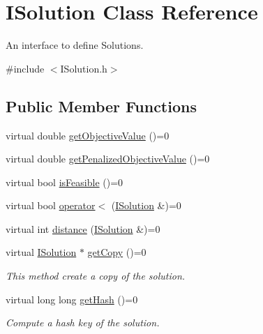 \hypertarget{classISolution}{\section{\-I\-Solution \-Class \-Reference}
\label{classISolution}
}


\-An interface to define \-Solutions.  




{\ttfamily \#include $<$\-I\-Solution.\-h$>$}

\subsection*{\-Public \-Member \-Functions}
\begin{DoxyCompactItemize}
\item 
virtual double \hyperlink{classISolution_a364e6cf3ee78b16b4b78d1a5612c5e70}{get\-Objective\-Value} ()=0
\item 
virtual double \hyperlink{classISolution_a577a02712a4e973a5acda9926d025afb}{get\-Penalized\-Objective\-Value} ()=0
\item 
virtual bool \hyperlink{classISolution_a4619382420ff245fcf12465557587ee6}{is\-Feasible} ()=0
\item 
virtual bool \hyperlink{classISolution_a9293d9e9eb00bab08dc25d11c61a1410}{operator$<$} (\hyperlink{classISolution}{\-I\-Solution} \&)=0
\item 
virtual int \hyperlink{classISolution_a60ba3056f6733fa50260466f3eb89a21}{distance} (\hyperlink{classISolution}{\-I\-Solution} \&)=0
\item 
\hypertarget{classISolution_accb0408d64b7e06f48054708eca34101}{virtual \hyperlink{classISolution}{\-I\-Solution} $\ast$ \hyperlink{classISolution_accb0408d64b7e06f48054708eca34101}{get\-Copy} ()=0}\label{classISolution_accb0408d64b7e06f48054708eca34101}

\begin{DoxyCompactList}\small\item\em \-This method create a copy of the solution. \end{DoxyCompactList}\item 
\hypertarget{classISolution_a5a3e735aab6b276f1f4da959442ffad6}{virtual long long \hyperlink{classISolution_a5a3e735aab6b276f1f4da959442ffad6}{get\-Hash} ()=0}\label{classISolution_a5a3e735aab6b276f1f4da959442ffad6}

\begin{DoxyCompactList}\small\item\em \-Compute a hash key of the solution. \end{DoxyCompactList}\end{DoxyCompactItemize}


